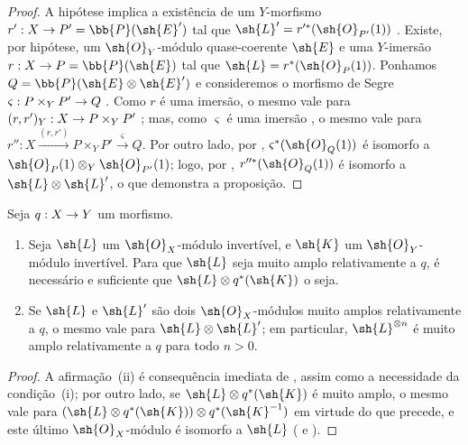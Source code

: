 \documentclass[oneside,10pt]{amsart}
\makeatletter
\newcommand{\ega@arrow}[2]{\mathchoice{#1}{#2}{#2}{#2}}
\renewcommand{\to}{\ega@arrow{\longrightarrow}{\rightarrow}}
\newcommand{\oldpage}[2][]{\marginnote{\normalfont\footnotesize\textbf{#1}~|~#2}\ignorespaces}
\let\EGAOriginalLabel\label
\renewcommand{\label}[1]{\phantomsection\EGAOriginalLabel{#1}}
\makeatother
\begin{document}
\begin{proof}
A hipótese implica a existência de um $Y$-morfismo $r':X\to P'=\bb{P}(\sh{E}')$ tal que $\sh{L}'=r'^*(\sh{O}_{P'}(1))$ .
Existe, por hipótese, um $\sh{O}_Y$-módulo quase-coerente $\sh{E}$ e uma
\oldpage[II]{81}
$Y$-imersão $r:X\to P=\bb{P}(\sh{E})$ tal que $\sh{L}=r^*(\sh{O}_P(1))$.
Ponhamos $Q=\bb{P}(\sh{E}\otimes\sh{E}')$ e consideremos o morfismo de Segre $\varsigma:P\times_Y P'\to Q$ .
Como $r$ é uma imersão, o mesmo vale para $(r,r')_Y:X\to P\times_Y P'$ ;
mas, como $\varsigma$ é uma imersão , o mesmo vale para $r'':X\xrightarrow{(r,r')}P\times_Y P'\xrightarrow{\varsigma}Q$.
Por outro lado, por , $\varsigma^*(\sh{O}_Q(1))$ é isomorfo a $\sh{O}_P(1)\otimes_Y\sh{O}_{P'}(1)$; logo, por , $r''^*(\sh{O}_Q(1))$ é isomorfo a $\sh{L}\otimes\sh{L}'$, o que demonstra a proposição.
\end{proof}

\begin{corollary}[4.4.9]
\label{II.4.4.9}
Seja $q:X\to Y$ um morfismo.
\begin{enumerate}
  \item[\rm{(i)}] Seja $\sh{L}$ um $\sh{O}_X$-módulo invertível, e $\sh{K}$ um $\sh{O}_Y$-módulo invertível.
  Para que $\sh{L}$ seja muito amplo relativamente a $q$, é necessário e suficiente que $\sh{L}\otimes q^*(\sh{K})$ o seja.
  \item[\rm{(ii)}] Se $\sh{L}$ e $\sh{L}'$ são dois $\sh{O}_X$-módulos muito amplos relativamente a $q$, o mesmo vale para $\sh{L}\otimes\sh{L}'$;
  em particular, $\sh{L}^{\otimes n}$ é muito amplo relativamente a $q$ para todo $n>0$.
\end{enumerate}
\end{corollary}

\begin{proof}
A afirmação~(ii) é consequência imediata de , assim como a necessidade da condição~(i);
por outro lado, se $\sh{L}\otimes q^*(\sh{K})$ é muito amplo, o mesmo vale para $(\sh{L}\otimes q^*(\sh{K}))\otimes q^*(\sh{K}^{-1})$ em virtude do que precede, e este último $\sh{O}_X$-módulo é isomorfo a $\sh{L}$ ( e ).
\end{proof}
\end{document}
